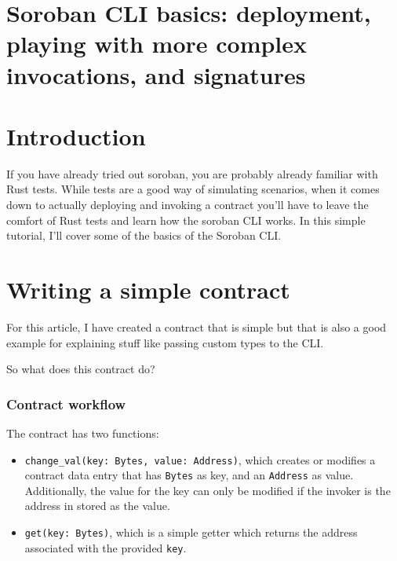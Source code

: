 
\usepackage{listings}

\section{Soroban CLI basics: deployment, playing with more complex invocations, and signatures}\label{soroban-cli-basics-deployment-playing-with-more-complex-invocations-and-signatures}

\section{Introduction}\label{introduction}

If you have already tried out soroban, you are probably already familiar with Rust tests. While tests are a good way of simulating scenarios, when it comes down to actually deploying and invoking a contract you'll have to leave the comfort of Rust tests and learn how the soroban CLI works. In this simple tutorial, I'll cover some of the basics of the Soroban CLI.

\section{Writing a simple contract}\label{writing-a-simple-contract}

For this article, I have created a contract that is simple but that is also a good example for explaining stuff like passing custom types to the CLI.

So what does this contract do?

\subsubsection{Contract workflow}\label{contract-workflow}

The contract has two functions:

\begin{itemize}
\tightlist
\item
  \texttt{change\_val(key:\ Bytes,\ value:\ Address)}, which creates or modifies a contract data entry that has \texttt{Bytes} as key, and an \texttt{Address} as value. Additionally, the value for the key can only be modified if the invoker is the address in stored as the value.
\item
  \texttt{get(key:\ Bytes)}, which is a simple getter which returns the address associated with the provided \texttt{key}.
\end{itemize}

